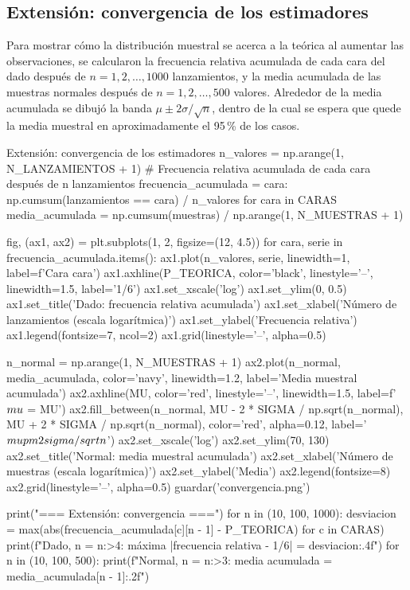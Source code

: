 \documentclass[11pt,letterpaper]{article}
\begin{document}
\subsection{Extensión: convergencia de los estimadores}

Para mostrar cómo la distribución muestral se acerca a la teórica al aumentar las observaciones, se calcularon la frecuencia relativa acumulada de cada cara del dado después de $n = 1, 2, \ldots, 1000$ lanzamientos, y la media acumulada de las muestras normales después de $n = 1, 2, \ldots, 500$ valores. Alrededor de la media acumulada se dibujó la banda $\mu \pm 2\sigma/\sqrt{n}$, dentro de la cual se espera que quede la media muestral en aproximadamente el 95\,\% de los casos.

\begin{codigo}[label=cod:ext]{Extensión: convergencia de los estimadores}
n_valores = np.arange(1, N_LANZAMIENTOS + 1)
# Frecuencia relativa acumulada de cada cara después de n lanzamientos
frecuencia_acumulada = {cara: np.cumsum(lanzamientos == cara) / n_valores for cara in CARAS}
media_acumulada = np.cumsum(muestras) / np.arange(1, N_MUESTRAS + 1)

fig, (ax1, ax2) = plt.subplots(1, 2, figsize=(12, 4.5))
for cara, serie in frecuencia_acumulada.items():
    ax1.plot(n_valores, serie, linewidth=1, label=f'Cara {cara}')
ax1.axhline(P_TEORICA, color='black', linestyle='--', linewidth=1.5, label='1/6')
ax1.set_xscale('log')
ax1.set_ylim(0, 0.5)
ax1.set_title('Dado: frecuencia relativa acumulada')
ax1.set_xlabel('Número de lanzamientos (escala logarítmica)')
ax1.set_ylabel('Frecuencia relativa')
ax1.legend(fontsize=7, ncol=2)
ax1.grid(linestyle='--', alpha=0.5)

n_normal = np.arange(1, N_MUESTRAS + 1)
ax2.plot(n_normal, media_acumulada, color='navy', linewidth=1.2, label='Media muestral acumulada')
ax2.axhline(MU, color='red', linestyle='--', linewidth=1.5, label=f'$\\mu$ = {MU}')
ax2.fill_between(n_normal, MU - 2 * SIGMA / np.sqrt(n_normal), MU + 2 * SIGMA / np.sqrt(n_normal),
                 color='red', alpha=0.12, label='$\\mu \\pm 2\\sigma/\\sqrt{n}$')
ax2.set_xscale('log')
ax2.set_ylim(70, 130)
ax2.set_title('Normal: media muestral acumulada')
ax2.set_xlabel('Número de muestras (escala logarítmica)')
ax2.set_ylabel('Media')
ax2.legend(fontsize=8)
ax2.grid(linestyle='--', alpha=0.5)
guardar('convergencia.png')

print("\n=== Extensión: convergencia ===")
for n in (10, 100, 1000):
    desviacion = max(abs(frecuencia_acumulada[c][n - 1] - P_TEORICA) for c in CARAS)
    print(f"Dado, n = {n:>4}: máxima |frecuencia relativa - 1/6| = {desviacion:.4f}")
for n in (10, 100, 500):
    print(f"Normal, n = {n:>3}: media acumulada = {media_acumulada[n - 1]:.2f}")
\end{codigo}
\end{document}
